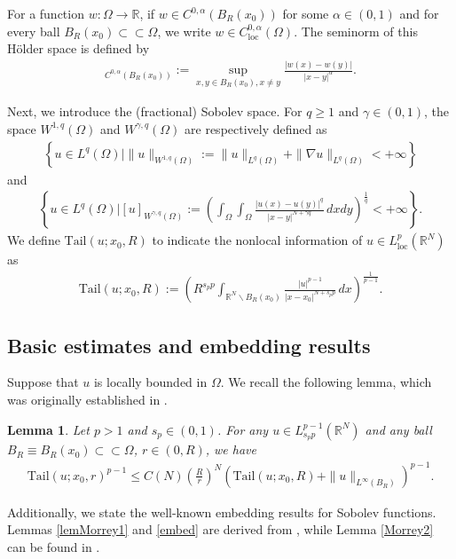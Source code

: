 \documentclass[reqno,10pt]{amsart}
\numberwithin{equation}{section}
\newtheorem{lemma}[theorem]{Lemma}
\begin{document}
For a function $w:\Omega\rightarrow\mathbb{R}$, if $w\in C^{0,\alpha}(B_R(x_0))$ for some $\alpha\in(0,1)$ and for every ball $B_R(x_0)\subset\subset\Omega$, we write $w\in C^{0,\alpha}_\mathrm{loc}(\Omega)$. The seminorm of this H\"{o}lder space is defined by
\begin{align*}
	[w]_{C^{0,\alpha}(B_R(x_0))}:=\sup\limits_{x,y\in B_R(x_0),x\neq y}\frac{|w(x)-w(y)|}{|x-y|^{\alpha}}.
\end{align*}

Next, we introduce the (fractional) Sobolev space. For $q\ge 1$ and $\gamma\in (0,1)$, the space $W^{1,q}(\Omega)$ and $W^{\gamma,q}(\Omega)$ are respectively defined as
\begin{align*}
	\left\lbrace u\in L^q(\Omega)\bigg|\|u\|_{W^{1,q}(\Omega)}:=\|u\|_{L^q(\Omega)}+\|\nabla u\|_{L^q(\Omega)}<+\infty\right\rbrace 
\end{align*}
and
\begin{align*}
	\left\lbrace u\in L^q(\Omega)\bigg|[u]_{W^{\gamma,q}(\Omega)}:=\left( \int_{\Omega}\int_{\Omega}\frac{|u(x)-u(y)|^q}{|x-y|^{N+\gamma q}}\,dxdy\right)^\frac{1}{q} <+\infty\right\rbrace .
\end{align*}
We define $\mathrm{Tail}(u;x_0,R)$ to indicate the nonlocal information of $u\in  L^p_{\mathrm{loc}}(\mathbb{R}^N)$ as
\begin{align*}
	\mathrm{Tail}(u;x_0,R):=\left( R^{s_pp}\int_{\mathbb{R}^N\backslash B_R(x_0)}\frac{|u|^{p-1}}{|x-x_0|^{N+s_p p}}\,dx\right)^\frac{1}{p-1}. 
\end{align*}

\subsection{Basic estimates and embedding results}
Suppose that $u$ is locally bounded in $\Omega$. We recall the following lemma, which was originally established in \cite[Lemma 2.3]{BLS18}.
\begin{lemma}
	\label{lem4}
	Let $p>1$ and $s_p\in (0, 1)$. For any $u\in L^{p-1}_{s_pp}(\mathbb{R}^N)$ and any ball $B_R\equiv B_R(x_0)\subset\subset\Omega$, $r\in (0,R)$, we have
	\begin{align*}
		\mathrm{Tail}(u;x_0,r)^{p-1}\le C(N)\left( \frac{R}{r}\right)^N\left( \mathrm{Tail}(u;x_0,R)+\|u\|_{L^\infty(B_R)}\right)^{p-1}. 
	\end{align*}
\end{lemma}

Additionally, we state the well-known embedding results for Sobolev functions. Lemmas \ref{lemMorrey1} and \ref{embed} are derived from \cite{NO23, BDL2401}, while Lemma \ref{Morrey2} can be found in \cite{L19}.
\end{document}
